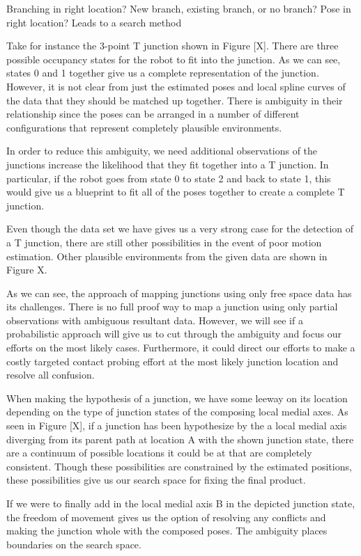 Branching in right location?
New branch, existing branch, or no branch?
Pose in right location?
Leads to a search method

Take for instance the 3-point T junction shown in Figure [X]. There are three possible occupancy states for the robot to fit into the junction. As we can see, states 0 and 1 together give us a complete representation of the junction. However, it is not clear from just the estimated poses and local spline curves of the data that they should be matched up together. There is ambiguity in their relationship since the poses can be arranged in a number of different configurations that represent completely plausible environments.

In order to reduce this ambiguity, we need additional observations of the junctions increase the likelihood that they fit together into a T junction. In particular, if the robot goes from state 0 to state 2 and back to state 1, this would give us a blueprint to fit all of the poses together to create a complete T junction. 

Even though the data set we have gives us a very strong case for the detection of a T junction, there are still other possibilities in the event of poor motion estimation. Other plausible environments from the given data are shown in Figure X.

As we can see, the approach of mapping junctions using only free space data has its challenges. There is no full proof way to map a junction using only partial observations with ambiguous resultant data. However, we will see if a probabilistic approach will give us to cut through the ambiguity and focus our efforts on the most likely cases. Furthermore, it could direct our efforts to make a costly targeted contact probing effort at the most likely junction location and resolve all confusion.

When making the hypothesis of a junction, we have some leeway on its location depending on the type of junction states of the composing local medial axes. As seen in Figure [X], if a junction has been hypothesize by the a local medial axis diverging from its parent path at location A with the shown junction state, there are a continuum of possible locations it could be at that are completely consistent. Though these possibilities are constrained by the estimated positions, these possibilities give us our search space for fixing the final product.

If we were to finally add in the local medial axis B in the depicted junction state, the freedom of movement gives us the option of resolving any conflicts and making the junction whole with the composed poses. The ambiguity places boundaries on the search space.

